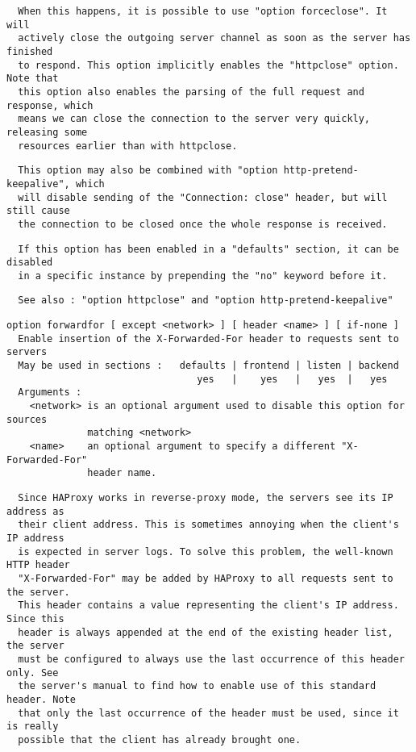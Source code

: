 \begin{verbatim}
  When this happens, it is possible to use "option forceclose". It will
  actively close the outgoing server channel as soon as the server has finished
  to respond. This option implicitly enables the "httpclose" option. Note that
  this option also enables the parsing of the full request and response, which
  means we can close the connection to the server very quickly, releasing some
  resources earlier than with httpclose.
\end{verbatim}

\begin{verbatim}
  This option may also be combined with "option http-pretend-keepalive", which
  will disable sending of the "Connection: close" header, but will still cause
  the connection to be closed once the whole response is received.
\end{verbatim}

\begin{verbatim}
  If this option has been enabled in a "defaults" section, it can be disabled
  in a specific instance by prepending the "no" keyword before it.
\end{verbatim}

\begin{verbatim}
  See also : "option httpclose" and "option http-pretend-keepalive"
\end{verbatim}

\begin{verbatim}
option forwardfor [ except <network> ] [ header <name> ] [ if-none ]
  Enable insertion of the X-Forwarded-For header to requests sent to servers
  May be used in sections :   defaults | frontend | listen | backend
                                 yes   |    yes   |   yes  |   yes
  Arguments :
    <network> is an optional argument used to disable this option for sources
              matching <network>
    <name>    an optional argument to specify a different "X-Forwarded-For"
              header name.
\end{verbatim}

\begin{verbatim}
  Since HAProxy works in reverse-proxy mode, the servers see its IP address as
  their client address. This is sometimes annoying when the client's IP address
  is expected in server logs. To solve this problem, the well-known HTTP header
  "X-Forwarded-For" may be added by HAProxy to all requests sent to the server.
  This header contains a value representing the client's IP address. Since this
  header is always appended at the end of the existing header list, the server
  must be configured to always use the last occurrence of this header only. See
  the server's manual to find how to enable use of this standard header. Note
  that only the last occurrence of the header must be used, since it is really
  possible that the client has already brought one.
\end{verbatim}

